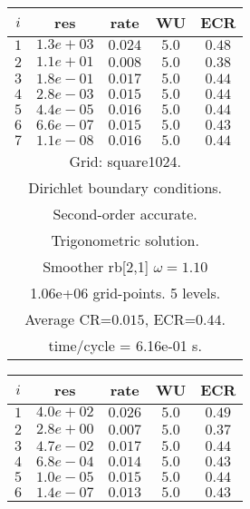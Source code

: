 \renewcommand{\tablefontsize}{\footnotesize}
\begin{table}[hbt]
\begin{center}{\tablefontsize
\begin{tabular}{|c|c|c|c|c|} \hline 
 $i$   & res      & rate    &  WU    & ECR  \\   \hline 
 $ 1$  & $ 1.3e+03$ & $0.024$ & $ 5.0$ & $0.48$ \\ 
 $ 2$  & $ 1.1e+01$ & $0.008$ & $ 5.0$ & $0.38$ \\ 
 $ 3$  & $ 1.8e-01$ & $0.017$ & $ 5.0$ & $0.44$ \\ 
 $ 4$  & $ 2.8e-03$ & $0.015$ & $ 5.0$ & $0.44$ \\ 
 $ 5$  & $ 4.4e-05$ & $0.016$ & $ 5.0$ & $0.44$ \\ 
 $ 6$  & $ 6.6e-07$ & $0.015$ & $ 5.0$ & $0.43$ \\ 
 $ 7$  & $ 1.1e-08$ & $0.016$ & $ 5.0$ & $0.44$ \\ 
\hline 
\multicolumn{5}{|c|}{Grid: square1024.}  \\
\multicolumn{5}{|c|}{Dirichlet boundary conditions.}  \\
\multicolumn{5}{|c|}{Second-order accurate.}  \\
\multicolumn{5}{|c|}{Trigonometric solution.}  \\
\multicolumn{5}{|c|}{Smoother rb[2,1] $\omega=1.10$}  \\
\multicolumn{5}{|c|}{1.06e+06 grid-points. 5 levels.}  \\
\multicolumn{5}{|c|}{Average CR=$0.015$, ECR=$0.44$.}  \\
\multicolumn{5}{|c|}{time/cycle = 6.16e-01 s.}  \\
\hline 
\end{tabular}
\qquad %
\begin{tabular}{|c|c|c|c|c|} \hline 
 $i$   & res      & rate    &  WU    & ECR  \\   \hline 
 $ 1$  & $ 4.0e+02$ & $0.026$ & $ 5.0$ & $0.49$ \\ 
 $ 2$  & $ 2.8e+00$ & $0.007$ & $ 5.0$ & $0.37$ \\ 
 $ 3$  & $ 4.7e-02$ & $0.017$ & $ 5.0$ & $0.44$ \\ 
 $ 4$  & $ 6.8e-04$ & $0.014$ & $ 5.0$ & $0.43$ \\ 
 $ 5$  & $ 1.0e-05$ & $0.015$ & $ 5.0$ & $0.44$ \\ 
 $ 6$  & $ 1.4e-07$ & $0.013$ & $ 5.0$ & $0.43$ \\ 

\end{tabular}}
\end{center}
\end{table}
